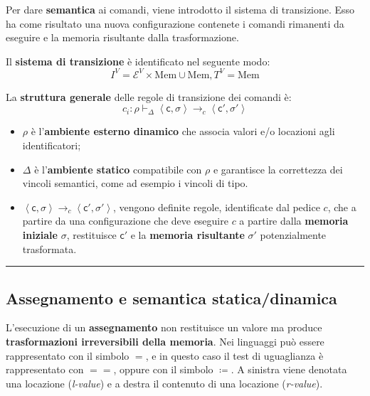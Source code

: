 \documentclass[a4paper]{article}
\newcommand{\longline}{\noindent\rule{\textwidth}{0.4pt}}
\begin{document}
 	Per dare \textcolor{Red3}{\textbf{semantica}} ai comandi, viene introdotto il sistema di transizione. Esso ha come risultato una nuova configurazione contenete i comandi rimanenti da eseguire e la memoria risultante dalla trasformazione.\newline
 	
 	\noindent
 	\begin{boxdef}
 		Il \textcolor{Red3}{\textbf{sistema di transizione}} è identificato nel seguente modo:
 		\begin{equation*}
 			I^{V} = \mathcal{E}^{V} \times \mathrm{Mem} \cup \mathrm{Mem}, T^{V} = \mathrm{Mem}
 		\end{equation*}
 	\end{boxdef}
 	
 	\noindent
 	La \textbf{struttura generale} delle regole di transizione dei comandi è:
 	\begin{equation*}
 		c_{i} : \rho \vdash_{\Delta} \left\langle \mathsf{c}, \mathsf{\sigma} \right\rangle \longrightarrow_{c} \left\langle \mathsf{c}', \mathsf{\sigma}' \right\rangle
 	\end{equation*}
 	\begin{itemize}
 		\item $\rho$ è l'\textbf{ambiente esterno dinamico} che associa valori e/o locazioni agli identificatori;
 		
 		\item $\Delta$ è l'\textbf{ambiente statico} compatibile con $\rho$ e garantisce la correttezza dei vincoli semantici, come ad esempio i vincoli di tipo.
 		
 		\item $\left\langle \mathsf{c}, \mathsf{\sigma} \right\rangle \longrightarrow_{c} \left\langle \mathsf{c}', \mathsf{\sigma}' \right\rangle$, vengono definite regole, identificate dal pedice $c$, che a partire da una configurazione che deve eseguire $c$ a partire dalla \textbf{memoria iniziale} $\mathsf{\sigma}$, restituisce $\mathsf{c}'$ e la \textbf{memoria risultante} $\mathsf{\sigma}'$ potenzialmente trasformata.
 	\end{itemize}
 	
 	\longline
 	
 	\subsection{Assegnamento e semantica statica/dinamica}
 	
 	L'esecuzione di un \textcolor{Red3}{\textbf{assegnamento}} non restituisce un valore ma produce \textbf{trasformazioni irreversibili della memoria}. Nei linguaggi può essere rappresentato con il simbolo $=$, e in questo caso il test di uguaglianza è rappresentato con $==$, oppure con il simbolo $\coloneq$. A sinistra viene denotata una locazione (\emph{l-value}) e a destra il contenuto di una locazione (\emph{r-value}).\newline
 	
\end{document}

